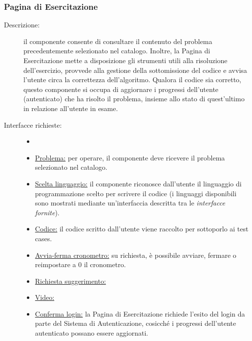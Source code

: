 \documentclass[11pt, a4paper]{article}
\theoremstyle{definition} %
\begin{document}
\subsubsection{Pagina di Esercitazione}\label{exepag}
\begin{description}
    \item[Descrizione:] il componente consente di consultare il contenuto del problema
    precedentemente selezionato nel catalogo. Inoltre, la Pagina di Esercitazione mette
    a disposizione gli strumenti utili alla risoluzione dell'esercizio, provvede alla
    gestione della sottomissione del codice e avvisa l'utente circa la correttezza dell'algoritmo.
    Qualora il codice sia corretto, questo componente si occupa di aggiornare i progressi
    dell'utente (autenticato) che ha risolto il problema, insieme allo stato di quest'ultimo
    in relazione all'utente in esame.

    \item[Interfacce richieste:]
    \begin{itemize}
        \item[]

        \item \underline{Problema:} per operare, il componente deve ricevere il problema
        selezionato nel catalogo.

        \item \underline{Scelta linguaggio:} il componente riconosce dall'utente il
        linguaggio di programmazione scelto per scrivere il codice (i linguaggi disponibili
        sono mostrati mediante un'interfaccia descritta tra le \textit{interfacce fornite}).

        \item \underline{Codice:} il codice scritto dall'utente viene raccolto
        per sottoporlo ai test cases.

        \item \underline{Avvia-ferma cronometro:} su richiesta, è possibile avviare, fermare o
        reimpostare a 0 il cronometro.

        \item \underline{Richiesta suggerimento:}
    
        \item \underline{Video:}

        \item \underline{Conferma login:} la Pagina di Esercitazione richiede l'esito
        del login da parte del Sistema di Autenticazione, cosicché i progressi dell'utente
        autenticato possano essere aggiornati.
    \end{itemize}


\end{description}
\end{document}
